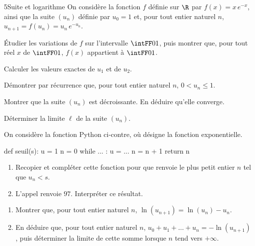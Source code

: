 \begin{exoBac}{5}{Suite et logarithme}
On considère la fonction $f$ définie sur $\R$ par $f(x)=x\,e^{-x}$, ainsi que la suite $(u_n)$ définie par $u_0=1$ et, pour tout entier
naturel $n$, $u_{n+1}=f(u_n)=u_n\,e^{-u_n}$.
\begin{questions}
  \item Étudier les variations de $f$ sur l'intervalle $\intFF01$, puis montrer que, pour tout réel $x$ de $\intFF01$, $f(x)$
    appartient à $\intFF01$.
\end{questions}
\begin{questions}[resume]
  \item Calculer les valeurs exactes de $u_1$ et de $u_2$.
  \item Démontrer par récurrence que, pour tout entier naturel $n$, $0<u_n\leq1$.
  \item Montrer que la suite $(u_n)$ est décroissante. En déduire qu'elle converge.
  \item Déterminer la limite $\ell$ de la suite $(u_n)$.
  \item On considère la fonction Python ci-contre, où  désigne la fonction exponentielle.
\begin{codecote}[0.46]
\begin{pythoncol}
def seuil(s):
    u = 1
    n = 0
    while ... :
        u = ...
        n = n + 1
    return n
\end{pythoncol}
\cote
\begin{enumerate}[label=\alph*),leftmargin=1.4em,itemsep=0.6mm,topsep=0mm]
  \item Recopier et compléter cette fonction pour que  renvoie le plus petit entier $n$ tel que $u_n<s$.
  \item L'appel  renvoie $97$. Interpréter ce résultat.
\end{enumerate}
\end{codecote}
  \item \begin{enumerate}[label=\alph*),leftmargin=1.4em,itemsep=0.4mm,topsep=0.4mm]
      \item Montrer que, pour tout entier naturel $n$, $\ln(u_{n+1})=\ln(u_n)-u_n$.
      \item En déduire que, pour tout entier naturel $n$, $u_0+u_1+\dots+u_n=-\ln(u_{n+1})$, puis déterminer la limite de cette somme
        lorsque $n$ tend vers $+\infty$.
    \end{enumerate}
\end{questions}
\end{exoBac}

